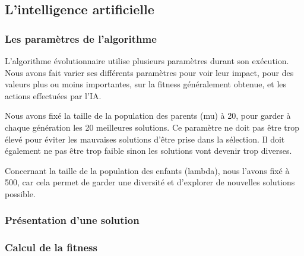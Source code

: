 \subsection{L'intelligence artificielle}

	\subsubsection{Les paramètres de l'algorithme}
	
		L'algorithme évolutionnaire utilise plusieurs paramètres durant son exécution.
		Nous avons fait varier ses différents paramètres pour voir leur impact, pour des valeurs plus ou moins importantes,
		sur la fitness généralement obtenue, et les actions effectuées par l'IA.
				
		Nous avons fixé la taille de la population des parents (mu) à 20, pour garder à chaque génération les 20 meilleures
		solutions. Ce paramètre ne doit pas être trop élevé pour éviter les mauvaises solutions d'être prise dans la sélection.
		Il doit également ne pas être trop faible sinon les solutions vont devenir trop diverses.
		
		Concernant la taille de la population des enfants (lambda), nous l'avons fixé à 500, car cela permet de garder une diversité
		et d'explorer de nouvelles solutions possible.
				
	\subsubsection{Présentation d'une solution}
	
	\subsubsection{Calcul de la fitness}
	
	
	
		